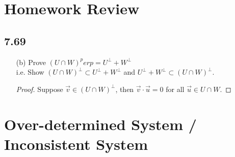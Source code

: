 \documentclass{report}
\begin{document}
\section{Homework Review}
\subsection{7.69}
\begin{enumerate}
\item[(b)]Prove $(U\cap W)^perp = U^\perp + W^\perp$\\
	i.e. Show $(U\cap W)^\perp\subset U^\perp + W^\perp$ and $U^\perp + W^\perp \subset (U\cap W)^\perp$.
	\begin{proof}
	Suppose $\vec{v}\in(U\cap W)^\perp$, then $\vec{v}\cdot\vec{u}=0$ for all $\vec{u}\in U\cap W$.
	\end{proof}
\end{enumerate}

\section{Over-determined System / Inconsistent System}
\end{document}
